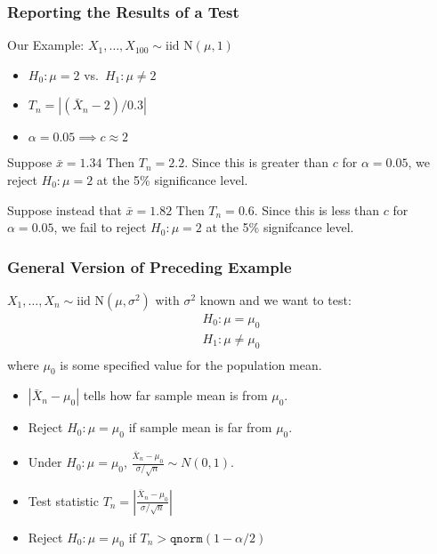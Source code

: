 \begin{frame}
  \frametitle{Reporting the Results of a Test}

  \begin{block}{Our Example: $X_1, \dots, X_{100} \sim \mbox{iid N}(\mu, 1)$}
    
    \begin{itemize}
      \item $H_0\colon \mu = 2$ vs.\ $H_1\colon \mu \neq 2$
      \item $T_n = |(\bar{X}_n - 2)/0.3|$
      \item $\alpha = 0.05 \implies c \approx 2$
    \end{itemize}
  \end{block}

  \pause

  \begin{block}{Suppose $\bar{x}=1.34$}
    Then $T_n = 2.2$. Since this is greater than $c$ for $\alpha = 0.05$, we \alert{reject $H_0\colon \mu=2$ at the 5\% significance level.}
  \end{block}

  \pause

  \begin{block}{Suppose instead that $\bar{x}=1.82$}
   Then $T_n = 0.6$.
   Since this is less than $c$ for $\alpha = 0.05$, we \alert{fail to reject $H_0\colon \mu = 2$ at the 5\% signifcance level.}
  \end{block}


\end{frame}
\begin{frame}
  \frametitle{General Version of Preceding Example}

 $X_1, \dots, X_n \sim \mbox{iid N}(\mu, \sigma^2)$ with $\sigma^2$ known and we want to test:
  \[
    \begin{array}{c}
      H_0\colon \mu = \mu_0\\
      H_1\colon \mu \neq \mu_0\\
    \end{array}
  \]
  where $\mu_0$ is some specified value for the population mean.

  \pause
  
  \begin{itemize}
    \item $|\bar{X}_n - \mu_0|$ tells how far sample mean is from $\mu_0$. \pause
    \item Reject $H_0\colon \mu=\mu_0$ if sample mean is far from $\mu_0$. \pause
    \item Under $H_0\colon \mu = \mu_0$, $\displaystyle\frac{\bar{X}_n - \mu_0}{\sigma/\sqrt{n}} \sim N(0,1)$. \pause
    \item Test statistic $T_n = \displaystyle\left|\frac{\bar{X}_n - \mu_0}{\sigma/\sqrt{n}}\right|$ \pause
    \item Reject $H_0\colon \mu = \mu_0$ if $T_n > \texttt{qnorm}(1 - \alpha/2)$
  \end{itemize}

  
  
\end{frame}
